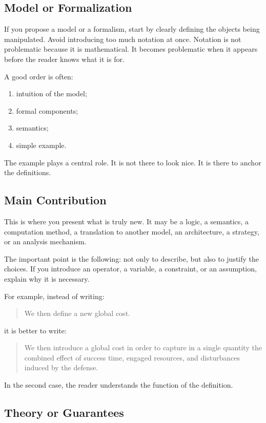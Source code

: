 \documentclass[11pt,a4paper]{article}
\theoremstyle{definition}
\begin{document}
\subsection*{Model or Formalization}

If you propose a model or a formalism, start by clearly defining the objects being manipulated. Avoid introducing too much notation at once. Notation is not problematic because it is mathematical. It becomes problematic when it appears before the reader knows what it is for.

A good order is often:
\begin{enumerate}[label=\arabic*.]
    \item intuition of the model;
    \item formal components;
    \item semantics;
    \item simple example.
\end{enumerate}

The example plays a central role. It is not there to look nice. It is there to anchor the definitions.

\subsection*{Main Contribution}

This is where you present what is truly new. It may be a logic, a semantics, a computation method, a translation to another model, an architecture, a strategy, or an analysis mechanism.

The important point is the following: not only to describe, but also to justify the choices. If you introduce an operator, a variable, a constraint, or an assumption, explain why it is necessary.

For example, instead of writing:
\begin{quote}
We then define a new global cost.
\end{quote}

it is better to write:
\begin{quote}
We then introduce a global cost in order to capture in a single quantity the combined effect of success time, engaged resources, and disturbances induced by the defense.
\end{quote}

In the second case, the reader understands the function of the definition.

\subsection*{Theory or Guarantees}
\end{document}
